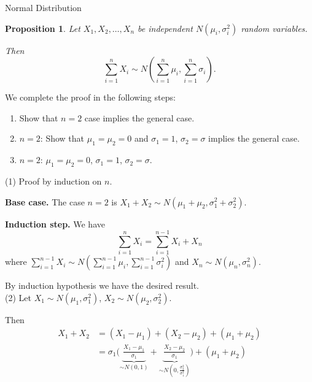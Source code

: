 \documentclass[a4paper,11pt]{amsbook}
\makeatletter
\def\subsection{\@startsection{subsection}{2}%
    \z@{.5\linespacing\@plus.7\linespacing}{-.5em}%
    {\normalfont\bfseries\color{darkblue}}}
\renewenvironment{proof}[1][\proofname]{\par
    \pushQED{\qed}%
    \normalfont \topsep6\p@\@plus6\p@\relax
    \trivlist
    \itemindent\z@ %
    \item[\hskip\labelsep
          \scshape
      #1\@addpunct{.}]\ignorespaces
}{%
    \popQED\endtrivlist\@endpefalse
}
\newtheorem{proposition}{\hspace{-2em} \color{darkblue} Proposition}[chapter]
\theoremstyle{definition}
\theoremstyle{remark}
\newcommand\0{\varnothing}
\makeatother
\begin{document}
    \subsection{Normal Distribution}

    \begin{proposition}
        Let $X_1,X_2,\ldots,X_n$ be independent $N(\mu_i,\sigma_i^2)$ random variables.

        Then $$\sum_{i=1}^nX_i\sim N\left(\sum_{i=1}^n\mu_i,\sum_{i=1}^n\sigma_i\right).$$
    \end{proposition}
    \begin{proof}
        We complete the proof in the following steps: \begin{enumerate}[label=(\arabic*)]
            \item Show that $n=2$ case implies the general case.
            \item $n=2$: Show that $\mu_1=\mu_2=0$ and $\sigma_1=1$, $\sigma_2=\sigma$ implies the general case.
            \item $n=2$: $\mu_1=\mu_2=0$, $\sigma_1=1$, $\sigma_2=\sigma$.
        \end{enumerate}
        (1) Proof by induction on $n$.

        \textbf{Base case.} The case $n=2$ is $X_1+X_2\sim N(\mu_1+\mu_2,\sigma_1^2+\sigma_2^2)$.

        \textbf{Induction step.} We have $$\sum_{i=1}^n X_i=\sum_{i=1}^{n-1}X_i+X_n$$ where
        $\sum_{i=1}^{n-1}X_i\sim N\left(\sum_{i=1}^{n-1}\mu_i,\sum_{i=1}^{n-1}\sigma_i^2\right)$ and $X_n\sim N(\mu_n,\sigma_n^2)$.
        
        By induction hypothesis we have the desired result.\\
        (2) Let $X_1\sim N(\mu_1,\sigma_1^2)$, $X_2\sim N(\mu_2,\sigma_2^2)$.

        Then \begin{align*}
            X_1+X_2&=(X_1-\mu_1)+(X_2-\mu_2)+(\mu_1+\mu_2) \\
            &=\sigma_1\Bigg(\underbrace{\frac{X_1-\mu_1}{\sigma_1}}_{\sim N(0,1)}
            +\underbrace{\frac{X_2-\mu_2}{\sigma_1}}_{\sim N\left(0,\frac{\sigma_2^2}{\sigma_1^2}\right)}\Bigg)+(\mu_1+\mu_2)
        \end{align*}


\end{proof}
\end{document}
